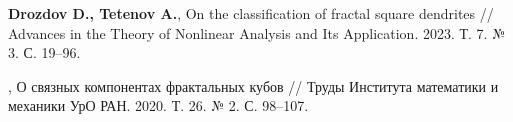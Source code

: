 \begin{thebibliography}{99}
{\bf Drozdov D., Tetenov A.}, 
On the classification of fractal square dendrites // 
Advances in the Theory of Nonlinear Analysis and Its Application. 2023. Т. 7. № 3. С. 19--96.

,
О связных компонентах фрактальных кубов // 
Труды Института математики и механики УрО РАН. 2020. Т. 26. № 2. С. 98--107.


\end{thebibliography}